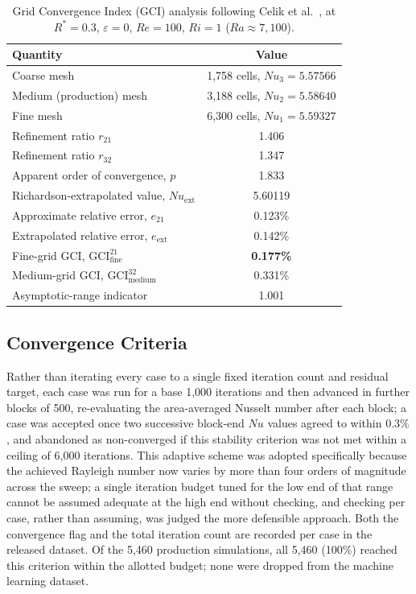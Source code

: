 \begin{table}[h]
\centering
\caption{Grid Convergence Index (GCI) analysis following Celik et al.~\cite{Celik2008}, at $R^\ast=0.3$, $\varepsilon=0$, $Re=100$, $Ri=1$ ($Ra\approx7{,}100$).}
\label{tab:gci}
\begin{tabular}{lc}
\toprule
Quantity & Value \\
\midrule
Coarse mesh & 1{,}758 cells, $Nu_3 = 5.57566$ \\
Medium (production) mesh & 3{,}188 cells, $Nu_2 = 5.58640$ \\
Fine mesh & 6{,}300 cells, $Nu_1 = 5.59327$ \\
Refinement ratio $r_{21}$ & 1.406 \\
Refinement ratio $r_{32}$ & 1.347 \\
Apparent order of convergence, $p$ & 1.833 \\
Richardson-extrapolated value, $Nu_\text{ext}$ & 5.60119 \\
Approximate relative error, $e_{21}$ & 0.123\% \\
Extrapolated relative error, $e_\text{ext}$ & 0.142\% \\
Fine-grid GCI, $\text{GCI}_\text{fine}^{21}$ & \textbf{0.177\%} \\
Medium-grid GCI, $\text{GCI}_\text{medium}^{32}$ & 0.331\% \\
Asymptotic-range indicator & 1.001 \\
\bottomrule
\end{tabular}
\end{table}

\subsection{Convergence Criteria}
\label{subsec:convergence}

Rather than iterating every case to a single fixed iteration count and residual target, each case was run for a base 1,000 iterations and then advanced in further blocks of 500, re-evaluating the area-averaged Nusselt number after each block; a case was accepted once two successive block-end $Nu$ values agreed to within $0.3\%$, and abandoned as non-converged if this stability criterion was not met within a ceiling of 6,000 iterations. This adaptive scheme was adopted specifically because the achieved Rayleigh number now varies by more than four orders of magnitude across the sweep; a single iteration budget tuned for the low end of that range cannot be assumed adequate at the high end without checking, and checking per case, rather than assuming, was judged the more defensible approach. Both the convergence flag and the total iteration count are recorded per case in the released dataset. Of the 5,460 production simulations, all 5,460 (100\%) reached this criterion within the allotted budget; none were dropped from the machine learning dataset.

